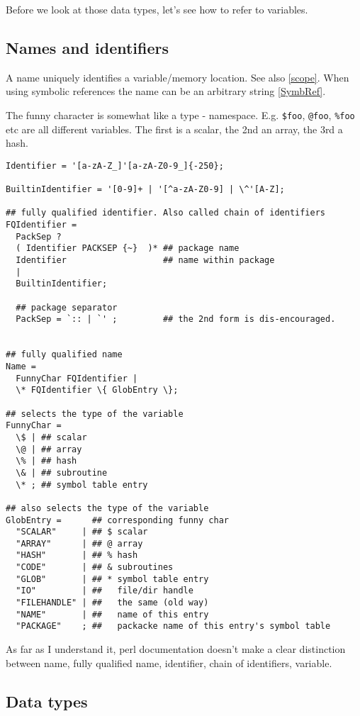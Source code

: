 \documentclass{article}
\begin{document}
Before we look at those data types, let's see how to refer to variables.

\subsection{Names and identifiers}

A name uniquely identifies a variable/memory location. See also \ref{scope}.
When using symbolic references the name can be an arbitrary string
\ref{SymbRef}. 

The funny character is somewhat like a type - namespace. E.g. \verb|$foo|,
\verb|@foo|, \verb|%foo| etc are all different variables. The first is a scalar,
the 2nd an array, the 3rd a hash.

\begin{verbatim}
Identifier = '[a-zA-Z_]'[a-zA-Z0-9_]{-250};

BuiltinIdentifier = '[0-9]+ | '[^a-zA-Z0-9] | \^'[A-Z];

## fully qualified identifier. Also called chain of identifiers
FQIdentifier =
  PackSep ?
  ( Identifier PACKSEP {~}  )* ## package name
  Identifier                   ## name within package
  |
  BuiltinIdentifier;
 
  ## package separator
  PackSep = `:: | `' ;         ## the 2nd form is dis-encouraged.

        
## fully qualified name 
Name =
  FunnyChar FQIdentifier |
  \* FQIdentifier \{ GlobEntry \};
  
## selects the type of the variable
FunnyChar = 
  \$ | ## scalar
  \@ | ## array
  \% | ## hash
  \& | ## subroutine
  \* ; ## symbol table entry

## also selects the type of the variable
GlobEntry =      ## corresponding funny char
  "SCALAR"     | ## $ scalar
  "ARRAY"      | ## @ array
  "HASH"       | ## % hash
  "CODE"       | ## & subroutines
  "GLOB"       | ## * symbol table entry
  "IO"         | ##   file/dir handle
  "FILEHANDLE" | ##   the same (old way)  
  "NAME"       | ##   name of this entry
  "PACKAGE"    ; ##   packacke name of this entry's symbol table
\end{verbatim}

As far as I understand it, perl documentation doesn't make a clear distinction
between name, fully qualified name, identifier, chain of identifiers, variable.

\subsection{Data types}
\end{document}
